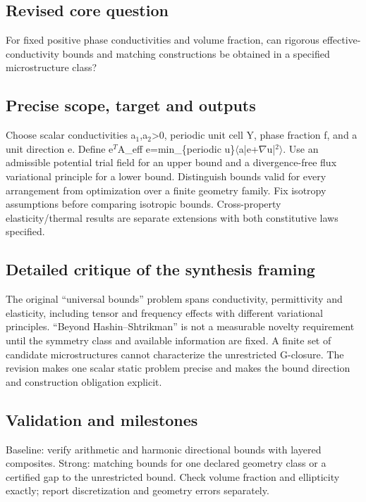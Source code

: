 \documentclass[
  11pt,
]{article}
\begin{document}
\subsection{Revised core question}

For fixed positive phase conductivities and volume fraction, can
rigorous effective-conductivity bounds and matching constructions be
obtained in a specified microstructure class?

\subsection{Precise scope, target and outputs}

Choose scalar conductivities
a\ensuremath{{}_{1}},a\ensuremath{{}_{2}}>0, periodic unit cell Y, phase
fraction f, and a unit direction e. Define e\ensuremath{{}^{T}}A\_eff
e=min\_\{periodic
u\}\ensuremath{\langle}a|e+\ensuremath{\nabla}u|\ensuremath{{}^{2}}\ensuremath{\rangle}.
Use an admissible potential trial field for an upper bound and a
divergence-free flux variational principle for a lower bound.
Distinguish bounds valid for every arrangement from optimization over a
finite geometry family. Fix isotropy assumptions before comparing
isotropic bounds. Cross-property elasticity/thermal results are separate
extensions with both constitutive laws specified.

\subsection{Detailed critique of the synthesis framing}

The original ``universal bounds'' problem spans conductivity,
permittivity and elasticity, including tensor and frequency effects with
different variational principles. ``Beyond Hashin--Shtrikman'' is not a
measurable novelty requirement until the symmetry class and available
information are fixed. A finite set of candidate microstructures cannot
characterize the unrestricted G-closure. The revision makes one scalar
static problem precise and makes the bound direction and construction
obligation explicit.

\subsection{Validation and milestones}

Baseline: verify arithmetic and harmonic directional bounds with layered
composites. Strong: matching bounds for one declared geometry class or a
certified gap to the unrestricted bound. Check volume fraction and
ellipticity exactly; report discretization and geometry errors
separately.
\end{document}
